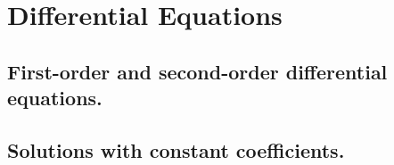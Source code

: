 \chapter{Differential Equations}\label{df}
\section{First-order and second-order differential equations.}\label{df:fo/so}
\section{Solutions with constant coefficients.}\label{df:const}